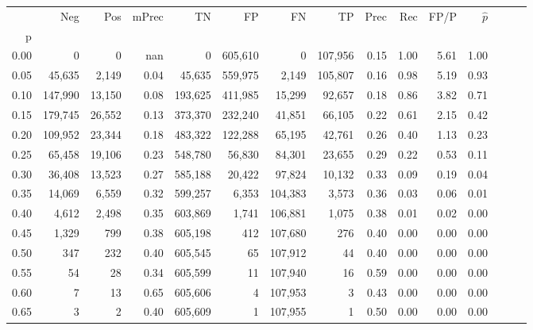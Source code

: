 \begin{tabular}{rrrrrrrrrrrrrrr}
\toprule
{} &      Neg &     Pos & mPrec &       TN &       FP &       FN &       TP &  Prec &   Rec &  FP/P & $\hat{p}$ \\
p    &          &         &       &          &          &          &          &       &       &       &           \\
\midrule
0.00 &        0 &       0 &   nan &        0 &  605,610 &        0 &  107,956 &  0.15 &  1.00 &  5.61 &      1.00 \\
0.05 &   45,635 &   2,149 &  0.04 &   45,635 &  559,975 &    2,149 &  105,807 &  0.16 &  0.98 &  5.19 &      0.93 \\
0.10 &  147,990 &  13,150 &  0.08 &  193,625 &  411,985 &   15,299 &   92,657 &  0.18 &  0.86 &  3.82 &      0.71 \\
0.15 &  179,745 &  26,552 &  0.13 &  373,370 &  232,240 &   41,851 &   66,105 &  0.22 &  0.61 &  2.15 &      0.42 \\
0.20 &  109,952 &  23,344 &  0.18 &  483,322 &  122,288 &   65,195 &   42,761 &  0.26 &  0.40 &  1.13 &      0.23 \\
0.25 &   65,458 &  19,106 &  0.23 &  548,780 &   56,830 &   84,301 &   23,655 &  0.29 &  0.22 &  0.53 &      0.11 \\
0.30 &   36,408 &  13,523 &  0.27 &  585,188 &   20,422 &   97,824 &   10,132 &  0.33 &  0.09 &  0.19 &      0.04 \\
0.35 &   14,069 &   6,559 &  0.32 &  599,257 &    6,353 &  104,383 &    3,573 &  0.36 &  0.03 &  0.06 &      0.01 \\
0.40 &    4,612 &   2,498 &  0.35 &  603,869 &    1,741 &  106,881 &    1,075 &  0.38 &  0.01 &  0.02 &      0.00 \\
0.45 &    1,329 &     799 &  0.38 &  605,198 &      412 &  107,680 &      276 &  0.40 &  0.00 &  0.00 &      0.00 \\
0.50 &      347 &     232 &  0.40 &  605,545 &       65 &  107,912 &       44 &  0.40 &  0.00 &  0.00 &      0.00 \\
0.55 &       54 &      28 &  0.34 &  605,599 &       11 &  107,940 &       16 &  0.59 &  0.00 &  0.00 &      0.00 \\
0.60 &        7 &      13 &  0.65 &  605,606 &        4 &  107,953 &        3 &  0.43 &  0.00 &  0.00 &      0.00 \\
0.65 &        3 &       2 &  0.40 &  605,609 &        1 &  107,955 &        1 &  0.50 &  0.00 &  0.00 &      0.00 \\

\end{tabular}
